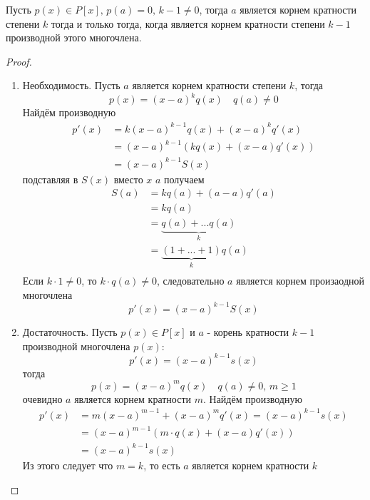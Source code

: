 \documentclass[../main/document.tex]{subfiles}
\begin{document}
\begin{thm}
Пусть $p(x)\in P[x],\,p(a)=0,\,k-1\neq 0$, тогда $a$ является корнем кратности степени $k$ тогда и только тогда, когда является корнем кратности степени $k-1$  производной этого многочлена.
\begin{proof}
\begin{enumerate}
\item Необходимость. Пусть $a$ является корнем кратности степени $k$, тогда
$$p(x)=(x-a)^{k}q(x)\quad q(a)\neq 0$$
Найдём производную
\begin{align*}
p'(x)&=k(x-a)^{k-1}q(x)+(x-a)^kq'(x)\\
&=(x-a)^{k-1}(kq(x)+(x-a)q'(x))\\
&=(x-a)^{k-1}S(x)
\end{align*}
подставляя в $S(x)$ вместо $x$ $a$ получаем
\begin{align*}
S(a)&=kq(a)+(a-a)q'(a)\\
&=kq(a)\\
&=\underbrace{q(a)+...q(a)}_k\\
&=\underbrace{(1+...+1)}_kq(a)\\
\end{align*}
Если $k\cdot 1\neq 0$, то $k\cdot q(a)\neq 0$, следовательно $a$ является корнем произаодной многочлена
$$p'(x)=(x-a)^{k-1}S(x)$$
\item Достаточность. Пусть $p(x)\in P[x]$ и $a$ - корень кратности $k-1$ производной многочлена $p(x)$:
$$p'(x)=(x-a)^{k-1}s(x)$$
тогда
$$p(x)=(x-a)^mq(x)\quad q(a)\neq 0,\,m\geq 1$$
очевидно $a$ является корнем кратности $m$. Найдём производную
\begin{align*}
p'(x)&=m(x-a)^{m-1}+(x-a)^mq'(x)=(x-a)^{k-1}s(x)\\
&=(x-a)^{m-1}(m\cdot q(x)+(x-a)q'(x))\\
&= (x-a)^{k-1}s(x)
\end{align*}
Из этого следует что $m=k$, то есть $a$ является корнем кратности $k$ 
\end{enumerate}

\end{proof}
\end{thm}
\end{document}
